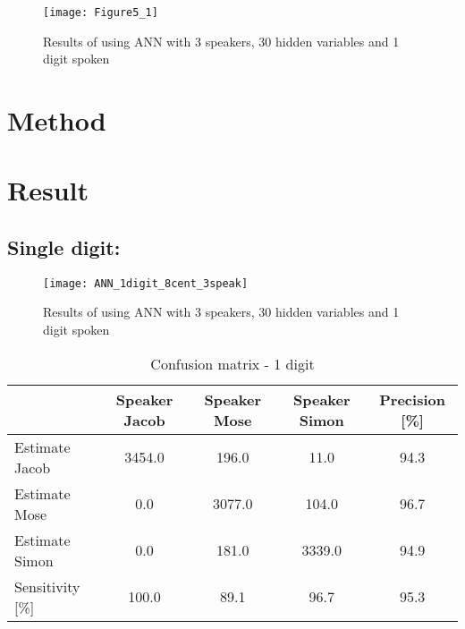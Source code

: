 \begin{figure}[H]
\centering
\texttt{[image: Figure5\_1]}
\caption{Results of using ANN with 3 speakers, 30 hidden variables and 1 digit spoken}
\label{fig:ANN_fig_theory}
\end{figure}

\section{Method}



\section{Result}


\subsection{Single digit:}
\begin{figure}[H]
\centering
\texttt{[image: ANN\_1digit\_8cent\_3speak]}
\caption{Results of using ANN with 3 speakers, 30 hidden variables and 1 digit spoken}
\label{fig:ANN_fig_1}
\end{figure}

\begin{table}[H]                                                    
\centering                                                          
\begin{tabular}{|l|c|c|c|c|}                                        
\hline                                                              
  & Speaker Jacob & Speaker Mose & Speaker Simon & Precision [\%] \\
\hline                                                              
Estimate Jacob & 3454.0 & 196.0 & 11.0 & 94.3 \\                    
\hline                                                              
Estimate Mose & 0.0 & 3077.0 & 104.0 & 96.7 \\                      
\hline                                                              
Estimate Simon & 0.0 & 181.0 & 3339.0 & 94.9 \\                     
\hline                                                              
Sensitivity [\%] & 100.0 & 89.1 & 96.7 & 95.3 \\                    
\hline                                                              
\end{tabular}                                                       
\caption{Confusion matrix - 1 digit}                                
\label{table:ANN_conf_1}                                            
\end{table}  



